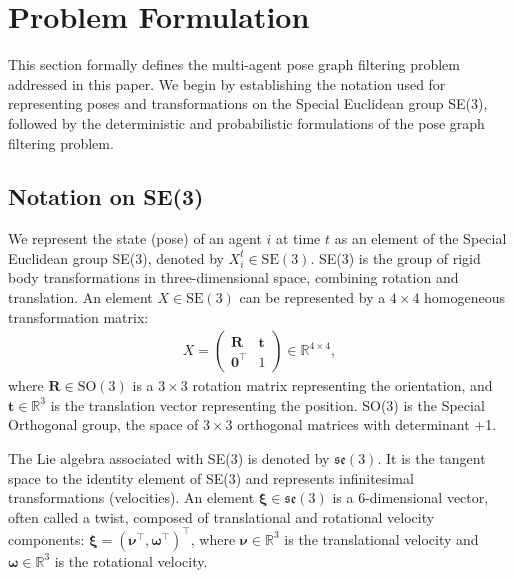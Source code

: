 \section{Problem Formulation}
\label{sec:problem_formulation}

This section formally defines the multi-agent pose graph filtering problem addressed in this paper. We begin by establishing the notation used for representing poses and transformations on the Special Euclidean group SE(3), followed by the deterministic and probabilistic formulations of the pose graph filtering problem.

\subsection{Notation on SE(3)}
\label{subsec:notation_se3}

We represent the state (pose) of an agent $i$ at time $t$ as an element of the Special Euclidean group SE(3), denoted by $X_i^t \in \text{SE}(3)$. SE(3) is the group of rigid body transformations in three-dimensional space, combining rotation and translation. An element $X \in \text{SE}(3)$ can be represented by a $4 \times 4$ homogeneous transformation matrix:
\begin{equation}
\begin{aligned}
X =
\begin{pmatrix}
{\mathbf{R}} & {\mathbf{t}} \\
{\mathbf{0}}^{\top} & 1
\end{pmatrix} \in {\mathbb{R}}^{4\times4},
\label{eq:se3_matrix_form}
\end{aligned}
\end{equation}
where ${\mathbf{R}} \in \text{SO}(3)$ is a $3 \times 3$ rotation matrix representing the orientation, and ${\mathbf{t}} \in {\mathbb{R}}^3$ is the translation vector representing the position. SO(3) is the Special Orthogonal group, the space of $3 \times 3$ orthogonal matrices with determinant +1.

The Lie algebra associated with SE(3) is denoted by ${\mathfrak{se}}(3)$. It is the tangent space to the identity element of SE(3) and represents infinitesimal transformations (velocities). An element $\boldsymbol{\xi} \in {\mathfrak{se}}(3)$ is a 6-dimensional vector, often called a twist, composed of translational and rotational velocity components: $\boldsymbol{\xi} = (\boldsymbol{\nu}^{\top}, \boldsymbol{\omega}^{\top})^{\top}$, where $\boldsymbol{\nu} \in {\mathbb{R}}^3$ is the translational velocity and $\boldsymbol{\omega} \in {\mathbb{R}}^3$ is the rotational velocity.

